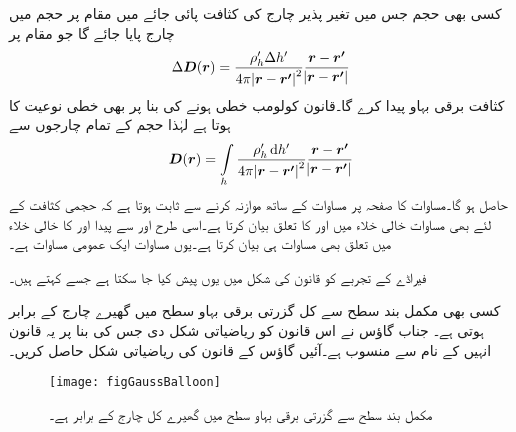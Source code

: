 کسی بھی حجم جس میں تغیر پذیر  چارج کی کثافت پائی جائے میں مقام  پر  حجم میں   چارج پایا جائے گا جو مقام  پر
\begin{align*}
\Delta {\ensuremath{{\boldsymbol{D}}}}({{\boldsymbol{r}}})=\frac{\rho_h' \Delta h'}{4\pi \abs{{{\boldsymbol{r}}}-{{\boldsymbol{r'}}}}^2} \frac{{{\boldsymbol{r}}}-{{\boldsymbol{r'}}}}{\abs{{{\boldsymbol{r}}}-{{\boldsymbol{r'}}}}}
\end{align*} 
کثافت برقی بہاو پیدا کرے گا۔قانون کولومب خطی ہونے کی بنا پر  بھی خطی نوعیت کا ہوتا ہے لہٰذا حجم کے تمام چارجوں سے
\begin{align}\label{مساوات_گاؤس_حجم_چارج_کے_بہاو_کی_کثافت}
\kvec{D}(\kvec{r})=\int\limits_{h}\frac{\rho_h' \dif h'}{4\pi \abs{\kvec{r}-\kvec{r'}}^2} \frac{\kvec{r}-\kvec{r'}}{\abs{\kvec{r}-\kvec{r'}}}
\end{align} 
حاصل ہو گا۔مساوات  کا صفحہ  پر مساوات  کے ساتھ موازنہ کرنے سے ثابت ہوتا ہے کہ حجمی کثافت کے لئے بھی مساوات  خالی خلاء میں  اور  کا تعلق بیان کرتا ہے۔اسی طرح  اور  سے پیدا  اور  کا خالی خلاء میں تعلق بھی مساوات   ہی بیان کرتا ہے۔یوں  مساوات  ایک عمومی مساوات ہے۔

فیراڈے کے تجربے کو قانون کی شکل میں یوں پیش کیا جا سکتا ہے جسے  کہتے ہیں۔

کسی بھی مکمل بند سطح سے  کل گزرتی برقی بہاو سطح میں گھیرے چارج کے برابر ہوتی ہے۔
جناب گاؤس نے اس قانون کو ریاضیاتی شکل دی جس کی بنا پر یہ قانون انہیں کے نام سے منسوب ہے۔آئیں گاؤس کے قانون کی ریاضیاتی شکل حاصل کریں۔
\begin{figure}
\centering
\texttt{[image: figGaussBalloon]}
\caption{مکمل بند سطح سے گزرتی برقی بہاو سطح میں گھیرے کل چارج کے برابر ہے۔}
\label{شکل_گاؤس_کا_قانون}
\end{figure}

